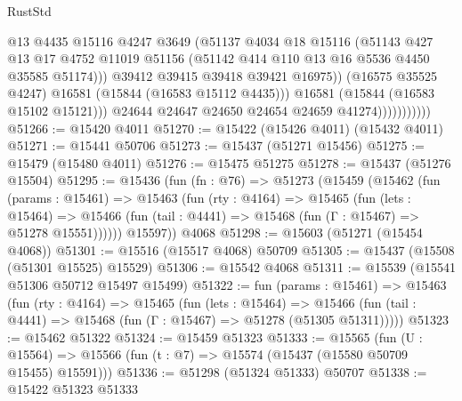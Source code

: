 \begin{lexlean}{RustStd}
\begin{coremodule}
                                  @13
                                  @4435
                                  @15116
                                  @4247
                                  @3649
                                  (@51137
                                    @4034
                                    @18
                                    @15116
                                    (@51143
                                      @427
                                      @13
                                      @17
                                      @4752
                                      @11019
                                      @51156
                                      (@51142 @414 @110 @13 @16 @5536 @4450 @35585 @51174)))
                                  @39412
                                  @39415
                                  @39418
                                  @39421
                                  @16975))
                              (@16575 @35525 @4247)
                              @16581
                              (@15844 (@16583 @15112 @4435)))
                            @16581
                            (@15844 (@16583 @15102 @15121)))
                          @24644
                          @24647
                          @24650
                          @24654
                          @24659
                          @41274)))))))))))
@51266 := @15420 @4011
@51270 := @15422 (@15426 @4011) (@15432 @4011)
@51271 := @15441 @50706
@51273 := @15437 (@51271 @15456)
@51275 := @15479 (@15480 @4011)
@51276 := @15475 @51275
@51278 := @15437 (@51276 @15504)
@51295 := @15436
    (fun (fn : @76) =>
    @51273
      (@15459
        (@15462
          (fun (params : @15461) =>
          @15463
            (fun (rty : @4164) =>
            @15465
              (fun (lets : @15464) =>
              @15466 (fun (tail : @4441) => @15468 (fun (Γ : @15467) => @51278 @15551))))))
        @15597))
    @4068
@51298 := @15603 (@51271 (@15454 @4068))
@51301 := @15516 (@15517 @4068) @50709
@51305 := @15437 (@15508 (@51301 @15525) @15529)
@51306 := @15542 @4068
@51311 := @15539 (@15541 @51306 @50712 @15497 @15499)
@51322 := fun (params : @15461) =>
  @15463
    (fun (rty : @4164) =>
    @15465
      (fun (lets : @15464) =>
      @15466 (fun (tail : @4441) => @15468 (fun (Γ : @15467) => @51278 (@51305 @51311)))))
@51323 := @15462 @51322
@51324 := @15459 @51323
@51333 := @15565
    (fun (U : @15564) => @15566 (fun (t : @7) => @15574 (@15437 (@15580 @50709 @15455) @15591)))
@51336 := @51298 (@51324 @51333) @50707
@51338 := @15422 @51323 @51333

\end{coremodule}
\end{lexlean}
